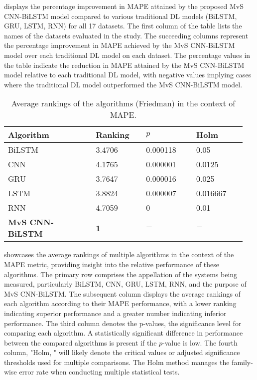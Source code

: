  displays the percentage improvement in MAPE attained by the proposed MvS CNN-BiLSTM model compared to various traditional DL models (BiLSTM,  GRU,  LSTM,  RNN) for all 17 datasets. The first column of the table lists the names of the datasets evaluated in the study. The succeeding columns represent the percentage improvement in MAPE achieved by the MvS CNN-BiLSTM model over each traditional DL model on each dataset. The percentage values in the table indicate the reduction in MAPE attained by the MvS CNN-BiLSTM model relative to each traditional DL model,  with negative values implying cases where the traditional DL model outperformed the MvS CNN-BiLSTM model.



    \begin{table}[H]
      \setlength{\tabcolsep}{3pt}
      {\renewcommand{\arraystretch}{1}%
      \begin{longtable}[c]{ p{0.35\linewidth} p{0.20\linewidth} p{0.20\linewidth} p{0.20\linewidth}  }
        \caption{Average rankings of the algorithms (Friedman) in the context of MAPE.}
        \label{rank_mape}
      \\ \hline
      Algorithm&Ranking&$p$&Holm
      \\ \hline
      \endhead
      BiLSTM&3.4706&0.000118&0.05\\
      CNN&4.1765&0.000001&0.0125\\
      GRU&3.7647&0.000016&0.025\\
      LSTM&3.8824&0.000007&0.016667\\
      RNN&4.7059&0&0.01\\
      \textbf{MvS CNN-BiLSTM}&\textbf{1}&$-$ &$-$\\\hline
      \end{longtable}}
      \end{table}


       showcases the average rankings of multiple algorithms in the context of the MAPE metric,  providing insight into the relative performance of these algorithms. The primary row comprises the appellation of the systems being measured,  particularly BiLSTM,  CNN,  GRU,  LSTM,  RNN,  and the purpose of MvS CNN-BiLSTM. The subsequent column displays the average rankings of each algorithm according to their MAPE performance,  with a lower ranking indicating superior performance and a greater number indicating inferior performance. The third column denotes the p-values, the significance level for comparing each algorithm. A statistically significant difference in performance between the compared algorithms is present if the $p$-value is low. The fourth column,  "Holm, " will likely denote the critical values or adjusted significance thresholds used for multiple comparisons. The Holm method manages the family-wise error rate when conducting multiple statistical tests.
      
